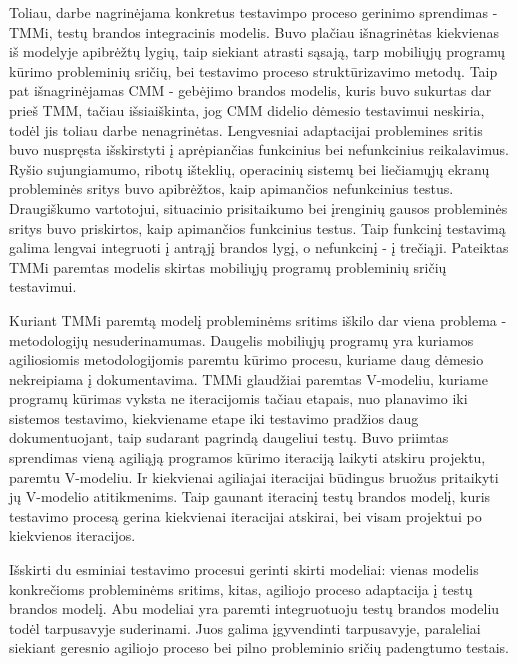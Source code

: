 \documentclass{VUMIFPSkursinis}
\begin{document}
Toliau, darbe nagrinėjama konkretus testavimpo proceso gerinimo sprendimas - TMMi, testų brandos integracinis modelis. Buvo plačiau išnagrinėtas kiekvienas iš modelyje apibrėžtų lygių, taip siekiant atrasti sąsają, tarp mobiliųjų programų kūrimo probleminių sričių, bei testavimo proceso struktūrizavimo metodų. Taip pat išnagrinėjamas CMM - gebėjimo brandos modelis, kuris buvo sukurtas dar prieš TMM, tačiau išsiaiškinta, jog CMM didelio dėmesio testavimui neskiria, todėl jis toliau darbe nenagrinėtas. Lengvesniai adaptacijai problemines sritis buvo nuspręsta išskirstyti į aprėpiančias funkcinius bei nefunkcinius reikalavimus. Ryšio sujungiamumo, ribotų išteklių, operacinių sistemų bei liečiamųjų ekranų probleminės sritys buvo apibrėžtos, kaip apimančios nefunkcinius testus. Draugiškumo vartotojui, situacinio prisitaikumo bei įrenginių gausos probleminės sritys buvo priskirtos, kaip apimančios funkcinius testus. Taip funkcinį testavimą galima lengvai integruoti į antrąjį brandos lygį, o nefunkcinį - į trečiąji. Pateiktas TMMi paremtas modelis skirtas mobiliųjų programų probleminių sričių testavimui.

Kuriant TMMi paremtą modelį probleminėms sritims iškilo dar viena problema - metodologijų nesuderinamumas. Daugelis mobiliųjų programų yra kuriamos agiliosiomis metodologijomis paremtu kūrimo procesu, kuriame daug dėmesio nekreipiama į dokumentavima. TMMi glaudžiai paremtas V-modeliu, kuriame programų kūrimas vyksta ne iteracijomis tačiau etapais, nuo planavimo iki sistemos testavimo, kiekviename etape iki testavimo pradžios daug dokumentuojant, taip sudarant pagrindą daugeliui testų. Buvo priimtas sprendimas vieną agiliąją programos kūrimo iteraciją laikyti atskiru projektu, paremtu V-modeliu. Ir kiekvienai agiliajai iteracijai būdingus bruožus pritaikyti jų V-modelio atitikmenims. Taip gaunant iteracinį testų brandos modelį, kuris testavimo procesą gerina kiekvienai iteracijai atskirai, bei visam projektui po kiekvienos iteracijos.

Išskirti du esminiai testavimo procesui gerinti skirti modeliai: vienas modelis konkrečioms probleminėms sritims, kitas, agiliojo proceso adaptacija į testų brandos modelį. Abu modeliai yra paremti integruotuoju testų brandos modeliu todėl tarpusavyje suderinami. Juos galima įgyvendinti tarpusavyje, paraleliai siekiant geresnio agiliojo proceso bei pilno probleminio sričių padengtumo testais.
\end{document}
